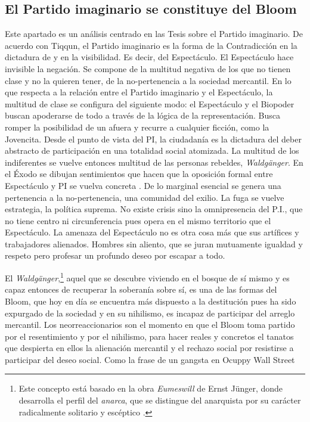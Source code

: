\subsection{El Partido imaginario se constituye del Bloom}
\label{sub:el-partido-imaginario-se-constituye-del-bloom}

Este apartado es un análisis centrado en las Tesis sobre el Partido imaginario. De acuerdo con Tiqqun, el Partido imaginario es la forma de la Contradicción en la dictadura de y en la visibilidad. Es decir, del Espectáculo. El Espectáculo hace invisible la negación. Se compone de la multitud negativa de los que no tienen clase y no la quieren tener, de la no-pertenencia a la sociedad mercantil. En lo que respecta a la relación entre el Partido imaginario y el Espectáculo, la multitud de clase se configura del siguiente modo: el Espectáculo y el Biopoder buscan apoderarse de todo a través de la lógica de la representación. Busca romper la posibilidad de un afuera y recurre a cualquier ficción, como la Jovencita. Desde el punto de vista del PI, la ciudadanía es la dictadura del deber abstracto de participación en una totalidad social atomizada. La multitud de los indiferentes se vuelve entonces multitud de las personas rebeldes, \emph{Waldgänger}. En el Éxodo se dibujan sentimientos que hacen que la oposición formal entre Espectáculo y PI se vuelva concreta \autocite{tiqqunTesisSobrePartido}. De lo marginal esencial se genera una pertenencia a la no-pertenencia, una comunidad del exilio. La fuga se vuelve estrategia, la política suprema. No existe crisis sino la omnipresencia del P.I., que no tiene centro ni circunferencia pues opera en el mismo territorio que el Espectáculo. La amenaza del Espectáculo no es otra cosa más que sus artífices y trabajadores alienados. Hombres sin aliento, que se juran mutuamente igualdad y respeto pero profesar un profundo deseo por escapar a todo.

El \emph{Waldgänger},\footnote{Este concepto está basado en la obra \emph{Eumeswill} de Ernst Jünger, donde desarrolla el perfil del \emph{anarca}, que se distingue del anarquista por su carácter radicalmente solitario y escéptico \autocite{jungerEumeswil2011}. } aquel que se descubre viviendo en el bosque de sí mismo y es capaz entonces de recuperar la soberanía sobre sí, es una de las formas del Bloom, que hoy en día se encuentra más dispuesto a la destitución pues ha sido expurgado de la sociedad y en su nihilismo, es incapaz de participar del arreglo mercantil. Los neorreaccionarios son el momento en que el Bloom toma partido por el resentimiento y por el nihilismo, para hacer reales y concretos el tanatos que despierta en ellos la alienación mercantil y el rechazo social por resistirse a participar del deseo social. Como la frase de un gangsta en Ocuppy Wall Street

